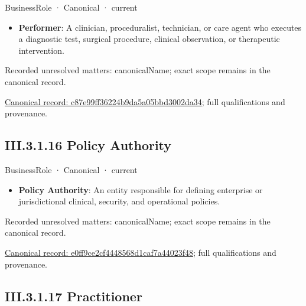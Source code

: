 \label{element:c87e99ff36224b9da5a05bbd3002da34}
{\small BusinessRole · Canonical · current}\par

\begin{itemize}


\item \textbf{Performer}: A clinician, proceduralist, technician, or care agent who executes a diagnostic test, surgical procedure, clinical observation, or therapeutic intervention.

\end{itemize}

{\small Recorded unresolved matters: canonicalName; exact scope remains in the canonical record.}\par
{\footnotesize \href{../../../../continuum/business/business-role/c87e99ff36224b9da5a05bbd3002da34.md}{Canonical record: c87e99ff36224b9da5a05bbd3002da34}; full qualifications and provenance.}\par
\subsection*{III.3.1.16 Policy Authority}
\label{navigation:III.3.1.16}

\label{element:e0ff9ce2cf4448568d1caf7a44023f48}
{\small BusinessRole · Canonical · current}\par

\begin{itemize}


\item \textbf{Policy Authority}: An entity responsible for defining enterprise or jurisdictional clinical, security, and operational policies.

\end{itemize}

{\small Recorded unresolved matters: canonicalName; exact scope remains in the canonical record.}\par
{\footnotesize \href{../../../../continuum/business/business-role/e0ff9ce2cf4448568d1caf7a44023f48.md}{Canonical record: e0ff9ce2cf4448568d1caf7a44023f48}; full qualifications and provenance.}\par
\subsection*{III.3.1.17 Practitioner}
\label{navigation:III.3.1.17}

